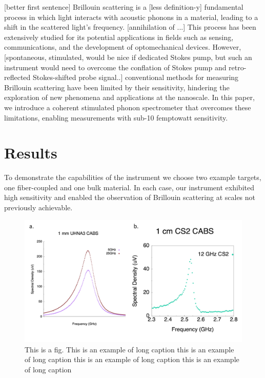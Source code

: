 \documentclass[pdflatex,iicol]{sn-jnl}%
\begin{document}
[better first sentence] Brillouin scattering is a [less definition-y] fundamental process in which light interacts with acoustic phonons in a material, leading to a shift in the scattered light's frequency. [annihilation of ...] This process has been extensively studied for its potential applications in fields such as sensing, communications, and the development of optomechanical devices. However, [spontaneous, stimulated, would be nice if dedicated Stokes pump, but such an instrument would need to overcome the conflation of Stokes pump and retro-reflected Stokes-shifted probe signal..] conventional methods for measuring Brillouin scattering have been limited by their sensitivity, hindering the exploration of new phenomena and applications at the nanoscale. In this paper, we introduce a coherent stimulated phonon spectrometer that overcomes these limitations, enabling measurements with sub-10 femptowatt sensitivity.


\section{Results}\label{Results}

To demonstrate the capabilities of the instrument we choose two example targets, one fiber-coupled and one bulk material. In each case, our instrument exhibited high sensitivity and enabled the observation of Brillouin scattering at scales not previously achievable.

\begin{figure}[t]
\centering
\includegraphics[width=\textwidth]{Observations.pdf}
\caption{This is a fig. This is an example of long caption this is an example of long caption this is an example of long caption this is an example of long caption}\label{Observations}
\end{figure}
\end{document}
